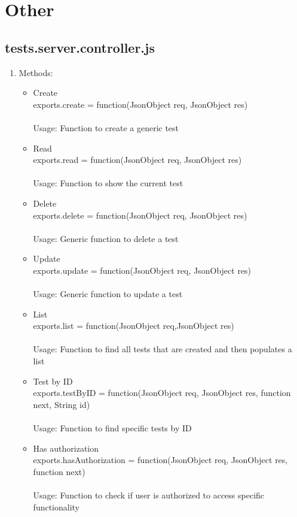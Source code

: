 \documentclass[a4paper,12pt]{report}
\begin{document}
\section{Other}
\subsection{tests.server.controller.js}
\begin{enumerate}
	\item Methods:
	\begin{itemize}
		\item Create \\ exports.create = function(JsonObject req, JsonObject res) 
		\\ \\ Usage: Function to create a generic test
		\item Read \\ exports.read = function(JsonObject req, JsonObject res) 
		\\ \\ Usage: Function to show the current test
		\item Delete \\ exports.delete = function(JsonObject req, JsonObject res) 
		\\ \\ Usage: Generic function to delete a test
		\item Update \\ exports.update = function(JsonObject req, JsonObject res) 
		\\ \\ Usage: Generic function to update a test 
		\item List \\ exports.list = function(JsonObject req,JsonObject res)
		\\ \\ Usage: Function to find all tests that are created and then populates a list
		\item Test by ID \\ exports.testByID = function(JsonObject req, JsonObject res, function next, String id)
		\\ \\ Usage: Function to find specific tests by ID
		\item Has authorization \\ exports.hasAuthorization = function(JsonObject req, JsonObject res, function next)
		\\ \\ Usage: Function to check if user is authorized to access specific functionality
	\end{itemize}
\end{enumerate}
\end{document}
